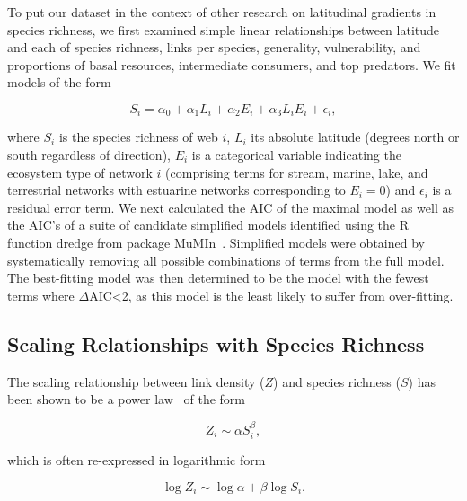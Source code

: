 \documentclass[12pt]{article}
\begin{document}
    To put our dataset in the context of other research on latitudinal gradients in species richness,
    we first examined simple linear relationships between latitude and each of 
    species richness, links per species, generality, vulnerability, and proportions
    of basal resources, intermediate consumers, and top predators. We fit models of the form

    \begin{equation}
    \label{Latfull}
    S_{i} = \alpha_{0} + \alpha_{1} L_{i} + \alpha_{2} E_{i} + \alpha_{3} L_{i} E_{i} + \epsilon_{i} ,
    \end{equation}

    \noindent where $S_{i}$ is the species richness of web $i$, $L_{i}$ its absolute
    latitude (degrees north or south  regardless of direction), $E_{i}$ is a categorical
    variable indicating the ecosystem type of network $i$ (comprising terms for stream, 
    marine, lake, and terrestrial networks with estuarine
    networks corresponding to $E_{i}=0$) and $\epsilon_{i}$ is a residual error term. 
    We next calculated the AIC
    of the maximal model as well as the AIC's of a suite of candidate simplified models identified
    using the R~\cite{R} function dredge from package MuMIn~\cite{MuMIn}. 
    Simplified models were obtained by
    systematically removing all possible combinations of terms from the full model.
    The best-fitting model was then determined to be the model with the fewest terms 
    where $\Delta$AIC\textless2, as this model is the least likely to suffer from over-fitting. 
    


  \subsection*{Scaling Relationships with Species Richness}

    The scaling relationship between link density ($Z$) and species richness ($S$)
    has been shown to be a power law~\cite{Riede2010} of the form 

    \begin{equation}
    \label{Power}
    Z_{i} \sim \alpha S_{i}^{\beta}  ,
    \end{equation}

    \noindent which is often re-expressed in logarithmic form 

    \begin{equation}
    \label{Loglog}
    \log{Z_{i}} \sim \log{\alpha} + \beta\log{S_{i}}  .
    \end{equation}
\end{document}

